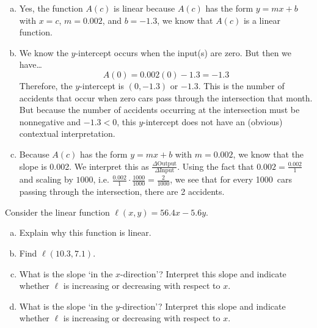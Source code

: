 \documentclass[11pt,letterpaper]{article}
\begin{document}
\sol
\begin{enumerate}[(a)]
\item Yes, the function $A(c)$ is linear because $A(c)$ has the form $y= mx + b$ with $x= c$, $m= 0.002$, and $b= -1.3$, we know that $A(c)$ is a linear function. \pspace

\item We know the $y$-intercept occurs when the input(s) are zero. But then we have\dots
	\[
	A(0)= 0.002(0) - 1.3= -1.3
	\]
Therefore, the $y$-intercept is $(0, -1.3)$ or $-1.3$. This is the number of accidents that occur when zero cars pass through the intersection that month. But because the number of accidents occurring at the intersection must be nonnegative and $-1.3 < 0$, this $y$-intercept does not have an (obvious) contextual interpretation. \pspace

\item Because $A(c)$ has the form $y= mx + b$ with $m= 0.002$, we know that the slope is 0.002. We interpret this as $\frac{\Delta \text{Output}}{\Delta \text{Input}}$. Using the fact that $0.002= \frac{0.002}{1}$ and scaling by $1000$, i.e. $\frac{0.002}{1} \cdot \frac{1000}{1000}= \frac{2}{1000}$, we see that for every 1000~cars passing through the intersection, there are 2 accidents. 
\end{enumerate}



\newpage



 Consider the linear function $\ell(x, y)= 56.4x - 5.6y$. 
\begin{enumerate}[(a)]
\item Explain why this function is linear. 
\item Find $\ell(10.3, 7.1)$.
\item What is the slope `in the $x$-direction'? Interpret this slope and indicate whether $\ell$ is increasing or decreasing with respect to $x$. 
\item What is the slope `in the $y$-direction'? Interpret this slope and indicate whether $\ell$ is increasing or decreasing with respect to $x$. 
\end{enumerate} \pspace
\end{document}
